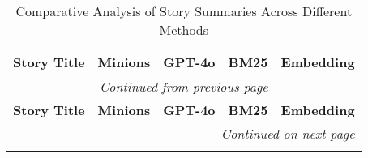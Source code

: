 



\scriptsize
\begin{longtable}{|p{1cm}|p{3cm}|p{3cm}|p{3cm}|p{3cm}|}    \caption{Comparative Analysis of Story Summaries Across Different Methods}
    \label{tab:story-summaries} \\
    \hline
    \textbf{Story Title} & \textbf{Minions} & \textbf{GPT-4o} & \textbf{BM25} & \textbf{Embedding} \\
    \hline
    \endfirsthead

    \hline
    \multicolumn{5}{|c|}{\textit{Continued from previous page}} \\
    \hline
    \textbf{Story Title} & \textbf{Minions} & \textbf{GPT-4o} & \textbf{BM25} & \textbf{Embedding} \\
    \hline
    \endhead

    \hline
    \multicolumn{5}{|r|}{\textit{Continued on next page}} \\
    \hline
    \endfoot

    \hline
    \endlastfoot


\end{longtable}
